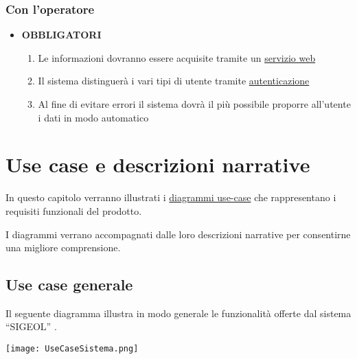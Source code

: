 \documentclass[11pt,a4paper]{article}
\begin{document}
\subsubsection{Con l’operatore}
\begin{itemize}
\item \textbf{OBBLIGATORI}
\begin{enumerate}
\item Le informazioni dovranno essere acquisite tramite un \underline{servizio web}
\item Il sistema distinguerà i vari tipi di utente tramite \underline{autenticazione}
\item Al fine di evitare errori il sistema dovrà il più possibile proporre all'utente i dati in modo automatico
\end{enumerate}
\end{itemize}
\section{Use case e descrizioni narrative}
In questo capitolo verranno illustrati i \underline{diagrammi use-case} che rappresentano
i requisiti funzionali del prodotto.

I diagrammi verrano accompagnati dalle loro descrizioni narrative per consentirne
una migliore comprensione.
\subsection{Use case generale}
Il seguente diagramma illustra in modo generale le funzionalità offerte dal sistema ``SIGEOL'' .
\begin{center}
 \texttt{[image: UseCaseSistema.png]}
\end{center}
\end{document}
